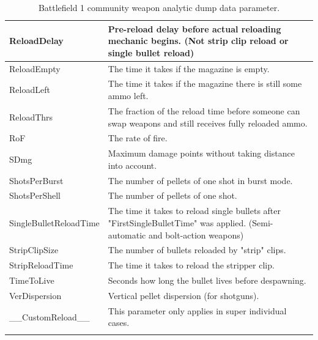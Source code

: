 \documentclass[MGS,Master,english]{twbook}%
\begin{document}
\begin{longtable}[c]{|l|p{10.5cm}|}
	ReloadDelay            & Pre-reload delay before actual reloading mechanic begins. (Not strip clip reload or single bullet reload)                      \\ \hline
	ReloadEmpty            & The time it takes if the magazine is empty.                                                                                    \\ \hline
	ReloadLeft             & The time it takes if the magazine there is still some ammo left.                                                               \\ \hline
	ReloadThrs             & The fraction of the reload time before someone can swap weapons and still receives fully reloaded ammo.                        \\ \hline
	RoF                    & The rate of fire.                                                                                                              \\ \hline
	SDmg                   & Maximum damage points without taking distance into account.                                                                    \\ \hline
	ShotsPerBurst          & The number of pellets of one shot in burst mode.                                                                               \\ \hline
	ShotsPerShell          & The number of pellets of one shot.                                                                                             \\ \hline
	SingleBulletReloadTime & The time it takes to reload single bullets after "FirstSingleBulletTime" was applied. (Semi-automatic and bolt-action weapons) \\ \hline
	StripClipSize          & The number of bullets reloaded by "strip" clips.                                                                               \\ \hline
	StripReloadTime        & The time it takes to reload the stripper clip.                                                                                 \\ \hline
	TimeToLive             & Seconds how long the bullet lives before despawning.                                                                           \\ \hline
	VerDispersion          & Vertical pellet dispersion (for shotguns).                                                                                     \\ \hline
	\_\_CustomReload\_\_   & This parameter only applies in super individual cases.                                                                         \\ \hline
	\caption{Battlefield 1 community weapon analytic dump data parameter.}
\end{longtable}
\end{document}
